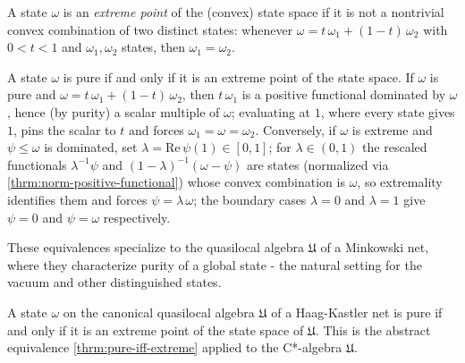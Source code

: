 \begin{definition}
    \label{def:extreme-state}
    \leanok
    A state $\omega$ is an \emph{extreme point} of the (convex) state space if it is not a nontrivial convex combination of two distinct states: whenever $\omega = t\,\omega_1 + (1-t)\,\omega_2$ with $0 < t < 1$ and $\omega_1, \omega_2$ states, then $\omega_1 = \omega_2$.
\end{definition}

\begin{theorem}
    \label{thrm:pure-iff-extreme}
    \leanok
    A state $\omega$ is pure if and only if it is an extreme point of the state space. If $\omega$ is pure and $\omega = t\,\omega_1 + (1-t)\,\omega_2$, then $t\,\omega_1$ is a positive functional dominated by $\omega$, hence (by purity) a scalar multiple of $\omega$; evaluating at $1$, where every state gives $1$, pins the scalar to $t$ and forces $\omega_1 = \omega = \omega_2$. Conversely, if $\omega$ is extreme and $\psi \le \omega$ is dominated, set $\lambda = \mathrm{Re}\,\psi(1) \in [0,1]$; for $\lambda \in (0,1)$ the rescaled functionals $\lambda^{-1}\psi$ and $(1-\lambda)^{-1}(\omega - \psi)$ are states (normalized via \ref{thrm:norm-positive-functional}) whose convex combination is $\omega$, so extremality identifies them and forces $\psi = \lambda\,\omega$; the boundary cases $\lambda = 0$ and $\lambda = 1$ give $\psi = 0$ and $\psi = \omega$ respectively.
\end{theorem}

These equivalences specialize to the quasilocal algebra $\mathfrak{U}$ of a Minkowski net, where they characterize purity of a global state - the natural setting for the vacuum and other distinguished states.

\begin{theorem}
    \label{thrm:pure-iff-extreme-quasilocal}
    \leanok
    A state $\omega$ on the canonical quasilocal algebra $\mathfrak{U}$ of a Haag-Kastler net is pure if and only if it is an extreme point of the state space of $\mathfrak{U}$. This is the abstract equivalence \ref{thrm:pure-iff-extreme} applied to the C*-algebra $\mathfrak{U}$.
\end{theorem}

